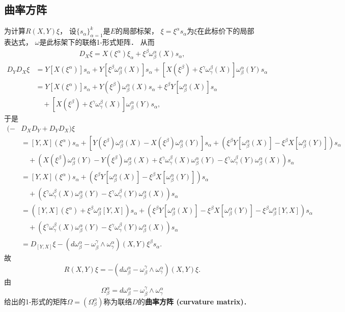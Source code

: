 \subsection{曲率方阵}
为计算$R(X,Y)\xi$， 设$\{s_\alpha\}_{\alpha=1}^k$是$E$的局部标架， $\xi=\xi^\alpha s_\alpha$为$\xi$在此标价下的局部表达式， $\omega$是此标架下的联络1-形式矩阵． 从而
$$
\begin{aligned}
D_X\xi=X(\xi^\alpha)\xi_\alpha+\xi^\beta\omega_\beta^\alpha(X) s_\alpha,
\end{aligned}
$$
$$
\begin{aligned}
D_YD_X\xi&=Y[X(\xi^\alpha)]s_\alpha+Y[\xi^\beta\omega_\beta^\alpha(X)] s_\alpha
+[X(\xi^\beta)+\xi^\gamma\omega_\gamma^\beta(X)]\omega_\beta^\alpha(Y) s_\alpha \\
&=Y[X(\xi^\alpha)]s_\alpha+Y(\xi^\beta)\omega_\beta^\alpha(X)s_\alpha+\xi^\beta Y[\omega_\beta^\alpha(X)]s_\alpha\\
&\quad+[X(\xi^\beta)+\xi^\gamma\omega_\gamma^\beta(X)]\omega_\beta^\alpha(Y) s_\alpha ,
\end{aligned}
$$
于是
$$
\begin{aligned}
(-&D_XD_Y+D_YD_X)\xi\\
&=[Y,X](\xi^\alpha)s_\alpha
+[Y(\xi^\beta)\omega_\beta^\alpha(X)-X(\xi^\beta)\omega_\beta^\alpha(Y)]s_\alpha+\left(\xi^\beta Y[\omega_\beta^\alpha(X)]-\xi^\beta X[\omega_\beta^\alpha(Y)]\right)s_\alpha\\
&\quad+\left(X(\xi^\beta)\omega_\beta^\alpha(Y)-Y(\xi^\beta)\omega_\beta^\alpha(X)+\xi^\gamma\omega_\gamma^\beta(X)\omega_\beta^\alpha(Y)-\xi^\gamma\omega_\gamma^\beta(Y)\omega_\beta^\alpha(X) \right)s_\alpha\\
&=[Y,X](\xi^\alpha)s_\alpha+\left(\xi^\beta Y[\omega_\beta^\alpha(X)]-\xi^\beta X[\omega_\beta^\alpha(Y)]\right)s_\alpha\\
&\quad+\left(\xi^\gamma\omega_\gamma^\beta(X)\omega_\beta^\alpha(Y)-\xi^\gamma\omega_\gamma^\beta(Y)\omega_\beta^\alpha(X) \right)s_\alpha\\
&=\left([Y,X](\xi^\alpha)+\xi^\beta\omega_\beta^\alpha[Y,X]\right)s_\alpha
+\left(\xi^\beta Y[\omega_\beta^\alpha(X)]-\xi^\beta X[\omega_\beta^\alpha(Y)]-\xi^\beta\omega_\beta^\alpha[Y,X]\right)s_\alpha\\
&\quad+\left(\xi^\gamma\omega_\gamma^\beta(X)\omega_\beta^\alpha(Y)-\xi^\gamma\omega_\gamma^\beta(Y)\omega_\beta^\alpha(X) \right)s_\alpha\\
&=D_{[Y,X]}\xi-(d\omega_\beta^\alpha-\omega_\beta^\gamma\wedge\omega_\gamma^\alpha)(X,Y)\xi^\beta s_\alpha.
\end{aligned}
$$
故
$$
R(X,Y)\xi=-(d\omega_\beta^\alpha-\omega_\beta^\gamma\wedge\omega_\gamma^\alpha)(X,Y)\xi.
$$
由
$$
\Omega_\beta^\alpha=d\omega_\beta^\alpha-\omega_\beta^\gamma\wedge\omega_\gamma^\alpha
$$
给出的1-形式的矩阵$\Omega=(\Omega_\beta^\alpha)$称为联络$D$的\textbf{曲率方阵 (curvature matrix)}． 

